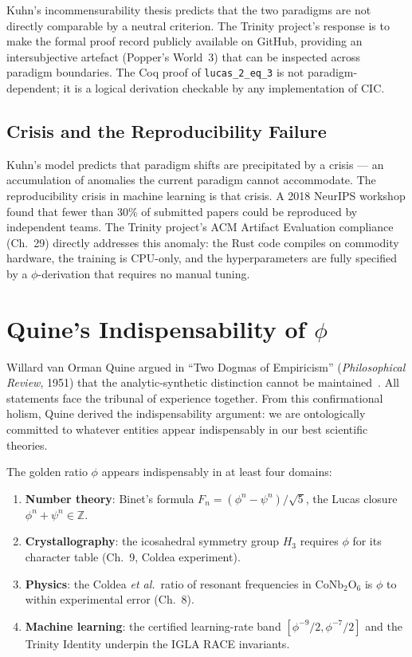 Kuhn's incommensurability thesis predicts that the two paradigms are not
directly comparable by a neutral criterion.  The Trinity project's response
is to make the formal proof record publicly available on GitHub, providing
an intersubjective artefact (Popper's World~3) that can be inspected
across paradigm boundaries.  The Coq proof of \texttt{lucas\_2\_eq\_3}
is not paradigm-dependent; it is a logical derivation checkable by any
implementation of CIC.

\subsection{Crisis and the Reproducibility Failure}

Kuhn's model predicts that paradigm shifts are precipitated by a crisis —
an accumulation of anomalies the current paradigm cannot accommodate.  The
reproducibility crisis in machine learning is that crisis.  A 2018 NeurIPS
workshop found that fewer than 30\% of submitted papers could be reproduced
by independent teams.  The Trinity project's ACM Artifact Evaluation
compliance (Ch.\ 29) directly addresses this anomaly: the Rust code compiles
on commodity hardware, the training is CPU-only, and the hyperparameters are
fully specified by a \(\phi\)-derivation that requires no manual tuning.

\section{Quine's Indispensability of \(\phi\)}
\label{sec:phd31-quine}

Willard van Orman Quine argued in ``Two Dogmas of Empiricism''
(\emph{Philosophical Review}, 1951) that the analytic-synthetic distinction
cannot be maintained~\cite{quine_two_dogmas}.  All statements face the tribunal
of experience together.  From this confirmational holism, Quine derived the
indispensability argument: we are ontologically committed to whatever entities
appear indispensably in our best scientific theories.

The golden ratio \(\phi\) appears indispensably in at least four domains:
\begin{enumerate}
  \item \textbf{Number theory}: Binet's formula \(F_n = (\phi^n - \psi^n)/\sqrt{5}\),
        the Lucas closure \(\phi^n + \psi^n \in \mathbb{Z}\).
  \item \textbf{Crystallography}: the icosahedral symmetry group \(H_3\)
        requires \(\phi\) for its character table (Ch.\ 9, Coldea experiment).
  \item \textbf{Physics}: the Coldea \emph{et al.}\ ratio of resonant
        frequencies in \(\mathrm{CoNb_2O_6}\) is \(\phi\) to within
        experimental error (Ch.\ 8).
  \item \textbf{Machine learning}: the certified learning-rate band
        \([\phi^{-9}/2, \phi^{-7}/2]\) and the Trinity Identity underpin the
        IGLA RACE invariants.
\end{enumerate}

